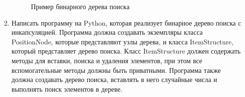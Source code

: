 \begin{enumerate}
\begin{figure}[h]
\centering
{}
\caption{Пример бинарного дерева поиска}
\end{figure}

\item Написать программу на Python, которая реализует бинарное дерево поиска с инкапсуляцией. Программа должна создавать экземпляры класса PositionNode, которые представляют узлы дерева, и класса ItemStructure, который представляет дерево поиска. Класс ItemStructure должен содержать методы для вставки, поиска и удаления элементов, при этом все вспомогательные методы должны быть приватными. Программа также должна создавать дерево поиска, вставлять в него случайные числа и выполнять поиск элементов в дереве.


\end{enumerate}
